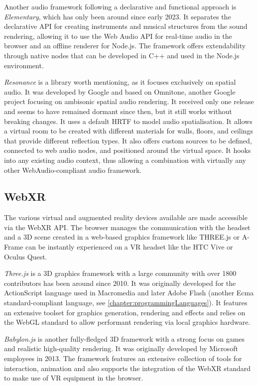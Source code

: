 Another audio framework following a declarative and functional approach is \emph{Elementary}, which has only been around since early 2023. It separates the declarative \ac{API} for creating instruments and musical structures from the sound rendering, allowing it to use the Web Audio \ac{API} for real-time audio in the browser and an offline renderer for Node.js. The framework offers extendability through native nodes that can be developed in C++ and used in the Node.js environment.

\emph{Resonance} is a library worth mentioning, as it focuses exclusively on spatial audio. It was developed by Google and based on Omnitone, another Google project focusing on ambisonic spatial audio rendering. It received only one release and seems to have remained dormant since then, but it still works without breaking changes. It uses a default \ac{HRTF} to model audio spatialisation. It allows a virtual room to be created with different materials for walls, floors, and ceilings that provide different reflection types. It also offers custom sources to be defined, connected to web audio nodes, and positioned around the virtual space. It hooks into any existing audio context, thus allowing a combination with virtually any other WebAudio-compliant audio framework.

\subsection{WebXR}

The various virtual and augmented reality devices available are made accessible via the WebXR \ac{API}. The browser manages the communication with the headset and a \ac{3D} scene created in a web-based graphics framework like THREE.js or A-Frame can be instantly experienced on a \ac{VR} headset like the HTC Vive or Oculus Quest.



\emph{Three.js} is a \ac{3D} graphics framework with a large community with over 1800 contributors has been around since 2010. It was originally developed for the ActionScript language used in Macromedia and later Adobe Flash (another Ecma standard-compliant language, see \autoref{chapter:programmingLanguages}). It features an extensive toolset for graphics generation, rendering and effects and relies on the WebGL standard to allow performant rendering via local graphics hardware.

\emph{Babylon.js} is another fully-fledged \ac{3D} framework with a strong focus on games and realistic high-quality rendering. It was originally developed by Microsoft employees in 2013. The framework features an extensive collection of tools for interaction, animation and also supports the integration of the \ac{WebXR} standard to make use of \ac{VR} equipment in the browser.

